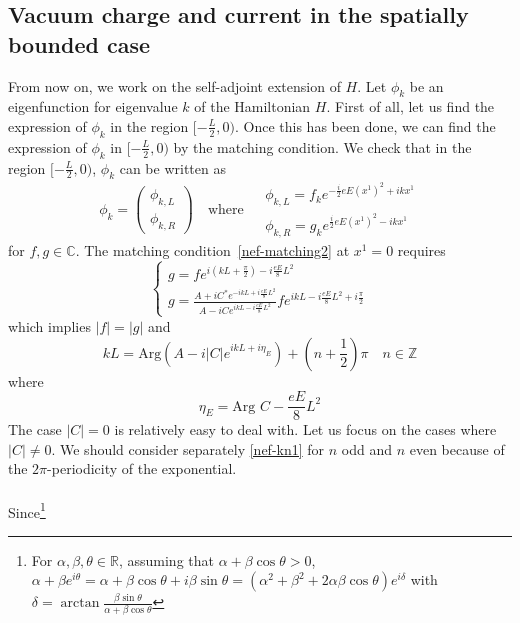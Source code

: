 \subsection{Vacuum charge and current in the spatially bounded case}
From now on, we work on the self-adjoint extension of $H$.
Let $\phi_k$ be an eigenfunction for eigenvalue $k$ of the Hamiltonian $H$. 
First of all, 
let us find the expression of $\phi_k$ in the region $[-\frac{L}{2}, 0)$.
Once this has been done, 
we can find the expression of $\phi_k$ in $[-\frac L 2, 0)$ by the matching condition.
We check that in the region $[-\frac{L}{2}, 0)$, 
$\phi_k$ can be written as 
\begin{equation}\label{nef-boundCond}
\phi_k =\begin{pmatrix}
\phi_{k,L}  \\
\phi_{k,R}
\end{pmatrix} 
\quad \textrm{where $\begin{split} 
 & \phi_{k,L} = f_k e^{-\frac{i}{2}eE(x^1)^2 + ikx^1} \\
& \phi_{k,R} = g_k e^{\frac{i}{2}eE(x^1)^2 - ikx^1}
\end{split}
$}
\end{equation}
for $f, g\in \mathbb{C}$. 
The matching condition~\cref{nef-matching2} at $x^1 = 0$ requires
\begin{equation}
\begin{cases}
g = fe^{i(kL + \frac{\pi}{2}) - i\frac{eE}{8}L^2}  \\
g = \frac{A + iC^* e^{-ikL + i\frac{eE}{8}L^2 }}{A - iC e^{ikL - i\frac{eE}{8}L^2}} fe^{ikL - i\frac{eE}{8}L^2 + i\frac{\pi}{2}}
\end{cases}
\end{equation}
which implies $|f| = |g|$ and
\begin{equation}\label{nef-kn1}
kL = \textrm{Arg}(A - i|C| e^{ikL + i\eta_E}) + (n + \frac{1}{2})\pi \quad n\in \mathbb{Z}
\end{equation}
where
\begin{equation*}
\eta_E = \textrm{Arg } C - \frac{eE}{8}L^2 
\end{equation*}
The case $|C| =0$ is relatively easy to deal with. Let us focus on the cases where $|C| \neq 0$. We should consider separately \cref{nef-kn1} for $n$ odd and $n$ even because of the $2\pi$-periodicity of the exponential. \\\\
Since\footnote{
For $\alpha, \beta, \theta \in \mathbb{R}$, assuming that $\alpha + \beta \cos \theta > 0$, $\alpha + \beta e^{i \theta} = \alpha + \beta \cos \theta + i\beta \sin \theta = (\alpha^2 + \beta^2 + 2\alpha \beta \cos \theta) e^{i \delta}$ with $\delta = \arctan \frac{\beta\sin\theta}{\alpha + \beta\cos\theta}$  
} 
